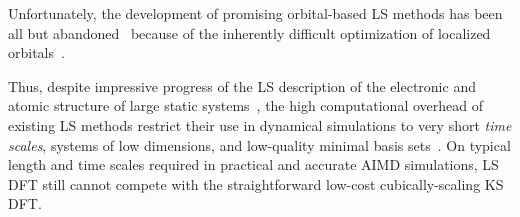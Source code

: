 \documentclass[aps,prl,reprint,amsmath,amssymb]{revtex4-1}
\begin{document}
Unfortunately, the development of promising orbital-based LS methods has been all but abandoned~\cite{a:weitao-yang-2013,a:ls-tsuchida-aomm} because of the inherently difficult optimization of localized orbitals~\cite{a:ls-rev-1999,a:ls-mauri-galli-car-1993,a:ls-ordejon-1995,a:ls-fattebert-2004,a:weitao-yang-2013,a:ls-tsuchida-aomm}. 


Thus, despite impressive progress of the LS description of the electronic and atomic structure of large static systems~\cite{Bowler2010,a:ls-dm-sign}, the high computational overhead of existing LS methods restrict their use in dynamical simulations to very short \emph{time scales}, systems of low dimensions, and low-quality minimal basis sets~\cite{a:ls-dm-sign, Otsuka2016, Hine2011, Bowler2010}. 
On typical length and time scales required in practical and accurate AIMD simulations, LS DFT still cannot compete with the straightforward low-cost cubically-scaling KS DFT.
\end{document}
